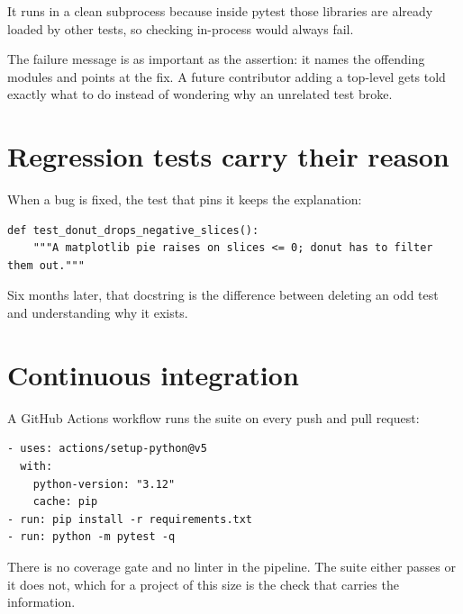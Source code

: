It runs in a clean subprocess because inside pytest those libraries are already
loaded by other tests, so checking  in-process would always
fail.

The failure message is as important as the assertion: it names the offending
modules and points at the fix. A future contributor adding a top-level
 gets told exactly what to do instead of wondering why an
unrelated test broke.

\section{Regression tests carry their reason}

When a bug is fixed, the test that pins it keeps the explanation:

\begin{lstlisting}[style=py]
def test_donut_drops_negative_slices():
    """A matplotlib pie raises on slices <= 0; donut has to filter them out."""
\end{lstlisting}

Six months later, that docstring is the difference between deleting an odd test
and understanding why it exists.

\section{Continuous integration}

A GitHub Actions workflow runs the suite on every push and pull request:

\begin{lstlisting}[style=sh]
- uses: actions/setup-python@v5
  with:
    python-version: "3.12"
    cache: pip
- run: pip install -r requirements.txt
- run: python -m pytest -q
\end{lstlisting}

There is no coverage gate and no linter in the pipeline. The suite either passes
or it does not, which for a project of this size is the check that carries the
information.
